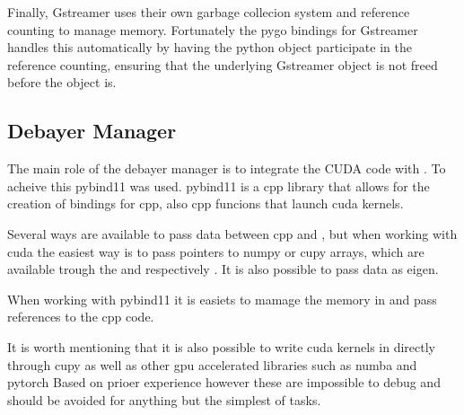 Finally, Gstreamer uses their own garbage collecion system and reference counting to manage memory.
Fortunately the \gls{pygo} bindings for Gstreamer handles this automatically by having the python object participate in the reference counting, ensuring that the underlying Gstreamer object is not freed before the \py object is.




\subsection{Debayer Manager}
The main role of the debayer manager is to integrate the CUDA code with \py.
To acheive this \gls{pybind11} was used.
\gls{pybind11} is a \gls{cpp} library that allows for the creation of \py bindings for \gls{cpp}, also \gls{cpp} funcions that launch \gls{cuda} kernels.

Several ways are available to pass data between \gls{cpp} and \py, but when working with \gls{cuda} the easiest way is to pass pointers to \gls{numpy} or \gls{cupy} arrays, which are available trough the  and  respectively \cite{numpyArrayInterfaceProtocol} \cite{cupyInteroperabilityCuPy12}.
It is also possible to pass data as \gls{eigen}.

When working with \gls{pybind11} it is easiets to mamage the memory in \py and pass references to the \gls{cpp} code.

It is worth mentioning that it is also possible to write \gls{cuda} kernels in \py directly through \gls{cupy} as well as other \gls{gpu} accelerated libraries such as \gls{numba} and \gls{pytorch}
Based on prioer experience however these are impossible to debug and should be avoided for anything but the simplest of tasks.